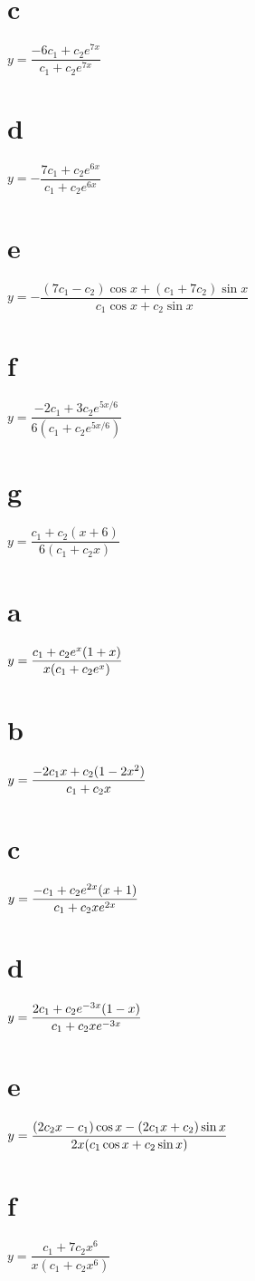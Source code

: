 \part{c} $y=\dfrac{-6c_1+c_2e^{7x}}{c_1+c_2e^{7x}}$
\;  \part{d} $y=-\dfrac{7c_1+c_2e^{6x}}{c_1+c_2e^{6x}}$
\part{e} $y=-\dfrac{(7c_1-c_2)\cos x+(c_1+7c_2)\sin x}{c_1\cos x+c_2\sin x}$
 \part{f} $y=\dfrac{-2c_1+3c_2e^{5x/6}}{6(c_1+c_2e^{5x/6})}$
\;  \part{g} $y=\dfrac{c_1+c_2(x+6)}{6(c_1+c_2x)}$

\part{a} $y=\displaystyle{\frac{c_1+c_2e^x(1+x)}{x(c_1+c_2e^x)}}$\;
\part{b} $y=\displaystyle{\frac{-2c_1x+c_2(1-2x^2)}{c_1+c_2x}}$ \\ [2\jot]
 \part{c} $y=\displaystyle{\frac{-c_1+c_2e^{2x}(x+1)}{c_1+c_2xe^{2x}}}$\;
\part{d}
$y=\displaystyle{\frac{2c_1+c_2e^{-3x}(1-x)}{c_1+c_2xe^{-3x}}}$
 \part{e} $y=\displaystyle{\frac{(2c_2x-c_1)\cos x-(2c_1x+c_2)\sin x
}{2x(c_1\cos x+c_2\sin x)}}$
\;  \part{f}  $y=\dfrac{c_1+7c_2x^6}{x(c_1+c_2x^6)}$



